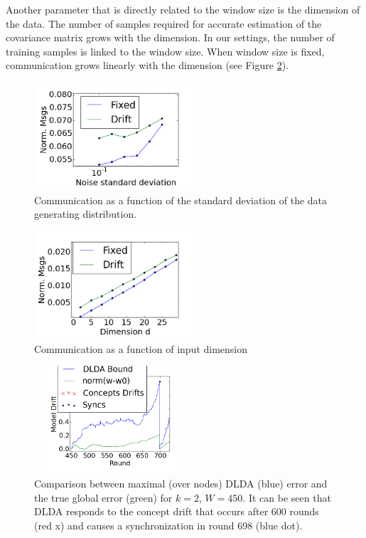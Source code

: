 \documentclass{sig-alternate-05-2015}
\begin{document}
Another parameter that is directly related to the window size is the dimension of the data. The number of samples required for accurate estimation of the covariance matrix grows with the dimension. In our settings, the number of training samples is linked to the window size. When window size is fixed, communication grows linearly with the dimension (see Figure \ref{Dimension}).
	
\begin{figure}
	\centering
	\includegraphics[width=60mm, height=4cm]{CommunicationOfFixedVsDrift/Noise.png}
	\caption{Communication as a function of the standard deviation of the
	data generating distribution.}
	\label{Noise}
	\end{figure}

\begin{figure}
	\centering
	\includegraphics[width=60mm, height=4cm]{CommunicationOfFixedVsDrift/Dimension.png}
	\caption{Communication as a function of input dimension}
	\label{Dimension}
	\end{figure}

\begin{figure}
	\centering
	\includegraphics[width=60mm, height=4cm]{Usenet/DriftDetected.png}
	\caption{Comparison between maximal (over nodes) DLDA (blue)
	error and the true global error (green) for $k=2$, $W=450$.
	It can be seen that DLDA responds to the concept drift that occurs
	after 600 rounds (red x) and causes a synchronization in round 698 (blue dot).}
	\label{usenet}
	\end{figure}
\end{document}
